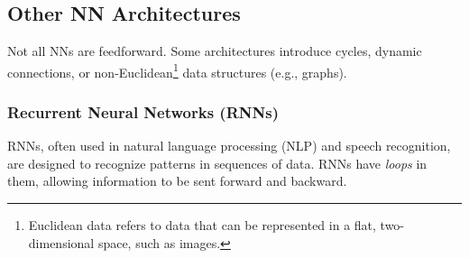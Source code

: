 \documentclass[oneside,11pt,dvipsnames]{book}
\numberwithin{equation}{section}
\theoremstyle{definition}
\theoremstyle{remark}
\begin{document}



\subsection{Other NN Architectures}

Not all NNs are feedforward. 
Some architectures introduce cycles, dynamic connections, or non-Euclidean\footnote{Euclidean data refers to data that can be represented in a flat, two-dimensional space, such as images.} data structures (e.g., graphs).

\subsubsection{Recurrent Neural Networks (RNNs)} RNNs, often used in natural language processing (NLP) and speech recognition, are designed to recognize patterns in sequences of data. RNNs have \emph{loops} in them, allowing information to be sent forward and backward.
\end{document}
